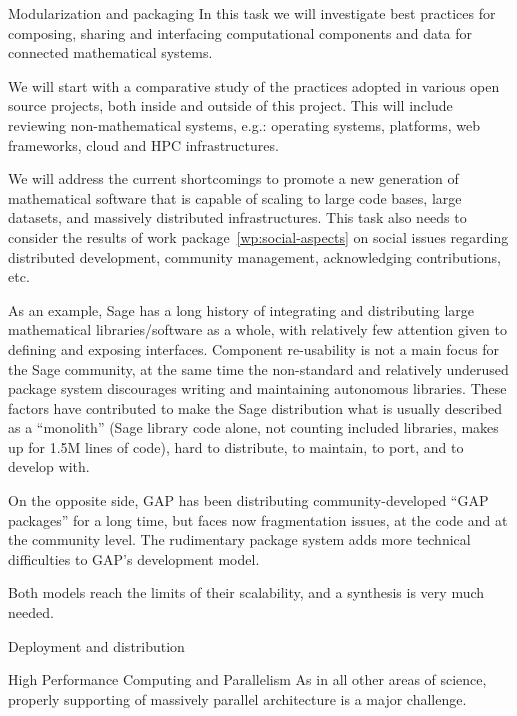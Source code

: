 \begin{Workpackage}{\thewpno}
  \begin{task}{Modularization and packaging}
    In this task we will investigate best practices for composing,
    sharing and interfacing computational components and data for
    connected mathematical systems.

    We will start with a comparative study of the practices adopted in
    various open source projects, both inside and outside of this
    project. This will include reviewing non-mathematical systems,
    e.g.: operating systems, platforms, web frameworks, cloud and HPC
    infrastructures.

    We will address the current shortcomings to promote a new
    generation of mathematical software that is capable of scaling to
    large code bases, large datasets, and massively distributed
    infrastructures. This task also needs to consider the results of
    work package~\ref{wp:social-aspects} on social issues regarding
    distributed development, community management, acknowledging
    contributions, etc.

    As an example, Sage has a long history of integrating and
    distributing large mathematical libraries/software as a whole,
    with relatively few attention given to defining and exposing
    interfaces. Component re-usability is not a main focus for the
    Sage community, at the same time the non-standard and relatively
    underused package system discourages writing and maintaining
    autonomous libraries. These factors have contributed to make the
    Sage distribution what is usually described as a ``monolith''
    (Sage library code alone, not counting included libraries, makes
    up for 1.5M lines of code), hard to distribute, to maintain, to
    port, and to develop with.

    On the opposite side, GAP has been distributing
    community-developed ``GAP packages'' for a long time, but faces
    now fragmentation issues, at the code and at the community
    level. The rudimentary package system adds more technical
    difficulties to GAP's development model.

    Both models reach the limits of their scalability, and a synthesis
    is very much needed.
  \end{task}
  
  \begin{task}{Deployment and distribution}
  \end{task}

  \begin{task}{High Performance Computing and Parallelism}
    As in all other areas of science, properly supporting of massively
    parallel architecture is a major challenge.


\end{task}
\end{Workpackage}
